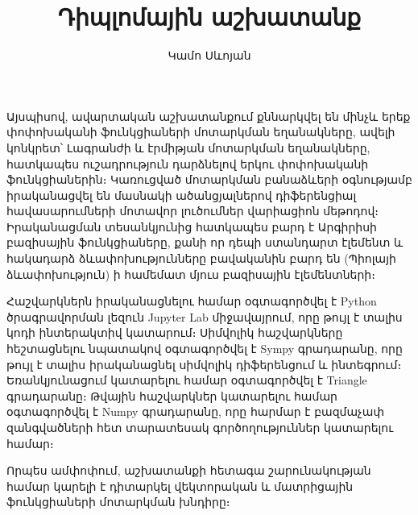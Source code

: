 \documentclass[fleqn, bachelor,subf,12pt,notitlepage]{article}
\title{Դիպլոմային աշխատանք}
\author{Կամո Սևոյան}
\begin{document}
\newpage
\section*{}
\sloppy

\hspace{\parindent}Այսպիսով, ավարտական աշխատանքում քննարկվել են մինչև երեք փոփոխականի ֆունկցիաների մոտարկման եղանակները, ավելի կոնկրետ՝ Լագրանժի և էրմիթյան մոտարկման եղանակները, հատկապես ուշադրություն դարձնելով երկու փոփոխականի ֆունկցիաներին։ Կառուցված մոտարկման բանաձևերի օգնությամբ իրականացվել են մասնակի ածանցյալներով դիֆերենցիալ հավասարումների մոտավոր լուծումներ վարիացիոն մեթոդով։ Իրականացման տեսանկյունից հատկապես բարդ է Արգիրիսի բազիսային ֆունկցիաները, քանի որ դեպի ստանդարտ էլեմենտ և հակադարձ ձևափոխությունները բավականին բարդ են (Պիոլայի ձևափոխություն) ի համեմատ մյուս բազիսային էլեմենտների։ 

Հաշվարկներն իրականացնելու համար օգտագործվել է Python ծրագրավորման լեզուն Jupyter Lab միջավայրում, որը թույլ է տալիս կոդի ինտերակտիվ կատարում։ Սիմվոլիկ հաշվարկները հեշտացնելու նպատակով օգտագործվել է Sympy գրադարանը, որը թույլ է տալիս իրականացնել սիմվոլիկ դիֆերենցում և ինտեգրում։ Եռանկյունացում կատարելու համար օգտագործվել է Triangle գրադարանը։ Թվային հաշվարկներ կատարելու համար օգտագործվել է Numpy գրադարանը, որը հարմար է բազմաչափ զանգվածների հետ տարատեսակ գործողություններ կատարելու համար։

Որպես ամփոփում, աշխատանքի հետագա շարունակության համար կարելի է դիտարկել վեկտորական և մատրիցային ֆունկցիաների մոտարկման խնդիրը։



\newpage
\section*{}
\end{document}
